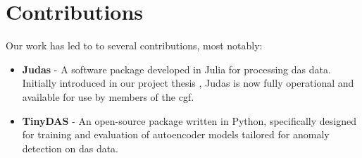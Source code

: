 \section{Contributions}

Our work has led to to several contributions, most notably:

\begin{itemize}
    \item \textbf{Judas} - A software package developed in Julia for processing \acrshort{das} data. Initially introduced in our project thesis \cite{projthesis}, Judas is now fully operational and available for use by members of the \acrshort{cgf}.
    \item \textbf{TinyDAS} -  An open-source package written in Python, specifically designed for training and evaluation of autoencoder models tailored for anomaly detection on \acrshort{das} data.
\end{itemize}